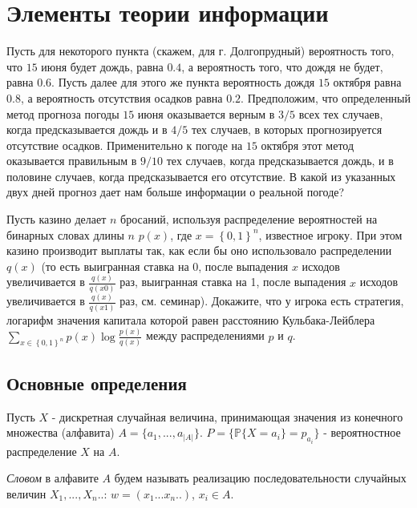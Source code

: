 \section{Элементы теории информации}

\begin{problem}
Пусть для некоторого пункта (скажем, для г. Долгопрудный) 
вероятность того, что $15$ июня будет дождь, равна $0.4$, а вероятность того, 
что дождя не будет, равна $0.6$. Пусть далее для этого же пункта вероятность 
дождя $15$ октября равна $0.8$, а вероятность отсутствия осадков равна $0.2$. 
Предположим, что определенный метод прогноза погоды $15$ июня оказывается 
верным в $3/5$ всех тех случаев, когда предсказывается дождь 
и в $4/5$ тех случаев, в которых прогнозируется отсутствие осадков. Применительно к 
погоде на $15$ октября этот метод оказывается правильным в $9/10$ тех случаев, 
когда предсказывается дождь, и в половине случаев, когда предсказывается его 
отсутствие. В какой из указанных двух дней прогноз дает нам больше 
информации о реальной погоде?
\end{problem}

\begin{problem}

Пусть казино делает $n$ бросаний, используя распределение вероятностей на бинарных словах длины $n$ $p\left(x\right)$, где $x=\left\{0,1\right\}^{n} $, известное игроку. При этом казино производит выплаты так, как если бы оно использовало распределении $q\left(x\right)$ (то есть выигранная ставка на 0, после выпадения $x$ исходов увеличивается в $\frac{q\left(x\right)}{q\left(x0\right)} $ раз, выигранная ставка на 1, после выпадения $x$ исходов увеличивается в $\frac{q\left(x\right)}{q\left(x1\right)} $ раз, см. семинар). Докажите, что у игрока есть стратегия, логарифм значения капитала которой равен расстоянию Кульбака-Лейблера $\sum _{x\in \left\{0,1\right\}^{n} }p\left(x\right)\log \frac{p\left(x\right)}{q\left(x\right)}  $ между распределениями $p$ и $q$.
\end{problem}


\subsection{Основные определения}
Пусть $X$ - дискретная случайная величина, принимающая значения из конечного множества (алфавита) $A = \{a_1,..., a_{|A|}\}$. $P = \{\mathbb{P}\{X = a_i\} = p_{a_i}\}$ - вероятностное распределение $X$ на $A$.

\begin{definition} \textit{Словом} в алфавите $A$ будем называть реализацию последовательности случайных величин $X_1,...,X_n..$: $w = (x_1...x_n..)$, $x_i \in A$.
\end{definition}

